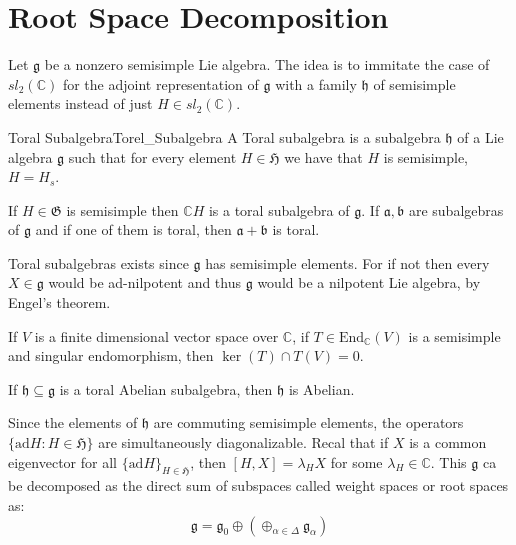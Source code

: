 \documentclass[crop=false,class=article]{standalone}                           %
\begin{document}
    \section{Root Space Decomposition}
        Let $\mathfrak{g}$ be a nonzero semisimple Lie algebra. The idea is to
        immitate the case of $sl_{2}(\mathbb{C})$ for the adjoint representation
        of $\mathfrak{g}$ with a family $\mathfrak{h}$ of semisimple elements
        instead of just $H\in{sl}_{2}(\mathbb{C})$.
        \begin{fdefinition}{Toral Subalgebra}{Torel_Subalgebra}
            A Toral subalgebra is a subalgebra $\mathfrak{h}$ of a Lie algebra
            $\mathfrak{g}$ such that for every element $H\in\mathfrak{H}$ we
            have that $H$ is semisimple, $H=H_{s}$.
        \end{fdefinition}
        \begin{theorem}
            If $H\in\mathfrak{G}$ is semisimple then $\mathbb{C}H$ is a toral
            subalgebra of $\mathfrak{g}$. If $\mathfrak{a},\mathfrak{b}$ are
            subalgebras of $\mathfrak{g}$ and if one of them is toral, then
            $\mathfrak{a}+\mathfrak{b}$ is toral.
        \end{theorem}
        Toral subalgebras exists since $\mathfrak{g}$ has semisimple elements.
        For if not then every $X\in\mathfrak{g}$ would be ad-nilpotent and thus
        $\mathfrak{g}$ would be a nilpotent Lie algebra, by Engel's theorem.
        \begin{theorem}
            If $V$ is a finite dimensional vector space over $\mathbb{C}$, if
            $T\in\textrm{End}_{\mathbb{C}}(V)$ is a semisimple and singular
            endomorphism, then $\ker(T)\cap{T}(V)=0$.
        \end{theorem}
        \begin{theorem}
            If $\mathfrak{h}\subseteq\mathfrak{g}$ is a toral Abelian
            subalgebra, then $\mathfrak{h}$ is Abelian.
        \end{theorem}
        Since the elements of $\mathfrak{h}$ are commuting semisimple elements,
        the operators $\{\textrm{ad}H:H\in\mathfrak{H}\}$ are simultaneously
        diagonalizable. Recal that if $X$ is a common eigenvector for all
        $\{\textrm{ad}H\}_{H\in\mathfrak{H}}$, then $[H,X]=\lambda_{H}X$ for
        some $\lambda_{H}\in\mathbb{C}$. This $\mathfrak{g}$ ca be decomposed as
        the direct sum of subspaces called weight spaces or root spaces as:
        \begin{equation}
            \mathfrak{g}=\mathfrak{g}_{0}
            \oplus(\oplus_{\alpha\in\Delta}\mathfrak{g}_{\alpha})
        \end{equation}
\end{document}
